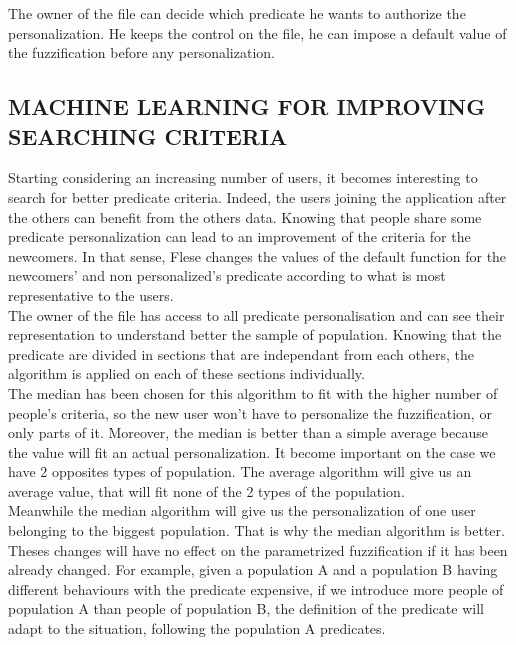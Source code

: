 \documentclass[a4paper,twoside]{article}
\begin{document}
The owner of the file can decide which predicate he wants to authorize the personalization. He keeps the control on the file, he can impose a default value of the fuzzification before any personalization. \\

\subsection{\uppercase{Machine learning for improving searching criteria}}

Starting considering an increasing number of users, it becomes interesting to search for better predicate criteria. Indeed, the users joining the application after the others can benefit from the others data. Knowing that people share some predicate personalization can lead to an improvement of the criteria for the newcomers. In that sense, Flese changes the values of the default function for the newcomers' and non personalized's predicate according to what is most representative to the users. \\

The owner of the file has access to all predicate personalisation and can see their representation to understand better the sample of population. Knowing that the predicate are divided in sections that are independant from each others, the algorithm is applied on each of these sections individually. \\

The median has been chosen for this algorithm to fit with the higher number of people's criteria, so the new user won't have to personalize the fuzzification, or only parts of it. Moreover, the median is better than a simple average because the value will fit an actual personalization. It become important on the case we have 2 opposites types of population. The average algorithm will give us an average value, that will fit none of the 2 types of the population.\\

Meanwhile the median algorithm will give us the personalization of one user belonging to the biggest population. That is why the median algorithm is better.\\

Theses changes will have no effect on the parametrized fuzzification if it has been already changed. For example, given a population A and a population B having different behaviours with the predicate expensive, if we introduce more people of population A than people of population B, the definition of the predicate will adapt to the situation, following the population A predicates. \\
\end{document}
